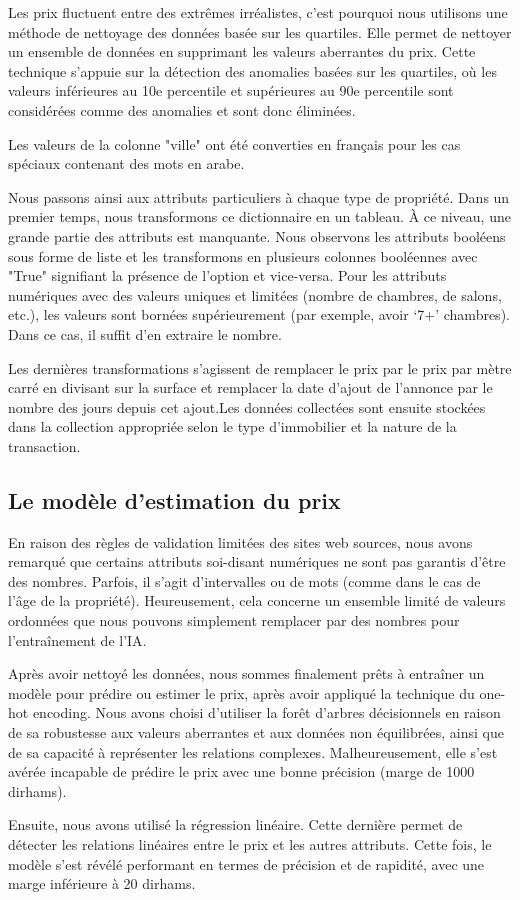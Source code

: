 \documentclass[a4paper,12pt]{report}
\numberwithin{equation}{section}
\begin{document}
Les prix fluctuent entre des extrêmes irréalistes, c’est pourquoi nous utilisons une méthode de nettoyage des données basée sur les quartiles. Elle permet de nettoyer un ensemble de données en supprimant les valeurs aberrantes du prix. Cette technique s'appuie sur la détection des anomalies basées sur les quartiles, où les valeurs inférieures au 10e percentile et supérieures au 90e percentile sont considérées comme des anomalies et sont donc éliminées.
\par
Les valeurs de la colonne "ville" ont été converties en français pour les cas spéciaux contenant des mots en arabe.
\\ \par
Nous passons ainsi aux attributs particuliers à chaque type de propriété. Dans un premier temps, nous transformons ce dictionnaire en un tableau. À ce niveau, une grande partie des attributs est manquante. Nous observons les attributs booléens sous forme de liste et les transformons en plusieurs colonnes booléennes avec "True" signifiant la présence de l’option et vice-versa. Pour les attributs numériques avec des valeurs uniques et limitées (nombre de chambres, de salons, etc.), les valeurs sont bornées supérieurement (par exemple, avoir ‘7+’ chambres). Dans ce cas, il suffit d'en extraire le nombre.
\\ \par
Les dernières transformations s’agissent de remplacer le prix par le prix par mètre carré en divisant sur la surface et remplacer la date d’ajout de l’annonce par le nombre des jours depuis cet ajout.Les données collectées sont ensuite stockées dans la collection appropriée selon le type d’immobilier et la nature de la transaction.
\subsection{Le modèle d’estimation du prix}
\par 
En raison des règles de validation limitées des sites web sources, nous avons remarqué que certains attributs soi-disant numériques ne sont pas garantis d'être des nombres. Parfois, il s'agit d'intervalles ou de mots (comme dans le cas de l'âge de la propriété). Heureusement, cela concerne un ensemble limité de valeurs ordonnées que nous pouvons simplement remplacer par des nombres pour l'entraînement de l’IA.
\\ \par
Après avoir nettoyé les données, nous sommes finalement prêts à entraîner un modèle pour prédire ou estimer le prix, après avoir appliqué la technique du one-hot encoding. Nous avons choisi d’utiliser la forêt d'arbres décisionnels en raison de sa robustesse aux valeurs aberrantes et aux données non équilibrées, ainsi que de sa capacité à représenter les relations complexes. Malheureusement, elle s'est avérée incapable de prédire le prix avec une bonne précision (marge de 1000 dirhams).
\\ \par
Ensuite, nous avons utilisé la régression linéaire. Cette dernière permet de détecter les relations linéaires entre le prix et les autres attributs. Cette fois, le modèle s'est révélé performant en termes de précision et de rapidité, avec une marge inférieure à 20 dirhams.
\newpage
\end{document}
